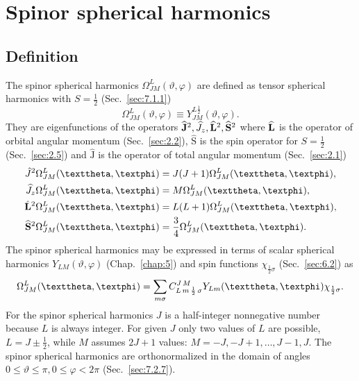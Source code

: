 \section{Spinor spherical harmonics}\label{sec:7.2}
\subsection{Definition}\label{sec:7.2.1}
The spinor spherical harmonics $\Omega_{J M}^{L}(\vartheta, \varphi)$ are defined as tensor spherical harmonics with $S=\frac{1}{2}$ (Sec.~\ref{sec:7.1.1})
\begin{equation}
\Omega_{J M}^{L}(\vartheta, \varphi) \equiv Y_{J M}^{L \frac{1}{2}}(\vartheta, \varphi). \label{eq:7:2:1}
\end{equation}
They are eigenfunctions of the operators $\widehat{\mathbf{J}}^{2}, \widehat{J}_{z}, \widehat{\mathbf{L}}^{2}, \widehat{\mathbf{S}}^{2}$ where $\widehat{\mathbf{L}}$ is the operator of orbital angular momentum (Sec.~\ref{sec:2.2}), $\widehat{\mathrm{S}}$ is the spin operator for $S=\frac{1}{2}$ (Sec.~\ref{sec:2.5}) and $\widehat{\mathrm{J}}$ is the operator of total angular momentum (Sec.~\ref{sec:2.1})
\begin{align}
\hat{J}^{2} \Omega_{J M}^{L}(\vartheta, \varphi) & =J(J+1) \Omega_{J M}^{L}(\vartheta, \varphi), \notag\\
\widehat{J}_{z} \Omega_{J M}^{L}(\vartheta, \varphi) & =M \Omega_{J M}^{L}(\vartheta, \varphi), \notag\\
\hat{\vect{L}}^{2} \Omega_{J M}^{L}(\vartheta, \varphi) & =L(L+1) \Omega_{J M}^{L}(\vartheta, \varphi), \label{eq:7:2:2}\\
\widehat{\vect{S}}^{2} \Omega_{J M}^{L}(\vartheta, \varphi) & =\frac{3}{4} \Omega_{J M}^{L}(\vartheta, \varphi). \notag
\end{align}
The spinor spherical harmonics may be expressed in terms of scalar spherical harmonics $Y_{L M}(\vartheta, \varphi)$ (Chap.~\ref{chap:5}) and spin functions $\chi_{\frac{1}{2} \sigma}$ (Sec.~\ref{sec:6.2}) as
\begin{equation}
\Omega_{J M}^{L}(\vartheta, \varphi)=\sum_{m \sigma} \clebsch{L}{m}{\frac{1}{2}}{\sigma}{J}{M} Y_{L m}(\vartheta, \varphi) \chi_{\frac{1}{2} \sigma}. \label{eq:7:2:3}
\end{equation}
For the spinor spherical harmonics $J$ is a half-integer nonnegative number because $L$ is always integer. For given $J$ only two values of $L$ are possible, $L=J \pm \frac{1}{2}$, while $M$ assumes $2 J+1$ values: $M=-J,-J+1, \ldots, J-1, J$. The spinor spherical harmonics are orthonormalized in the domain of angles $0 \leq \vartheta \leq \pi, 0 \leq \varphi<2 \pi$ (Sec.~\ref{sec:7.2.7}).

